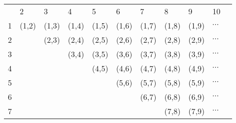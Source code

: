 \begin{table}[!htb]
		\footnotesize
		\centering
		\begin{tabular}{lllllllllll}
			& 2                             & 3                             & 4                            & 5                             & 6                             & 7                             & 8                             & 9                             & 10                                &  \\
			1 & \cellcolor[HTML]{9B9B9B}(1,2) & \cellcolor[HTML]{9B9B9B}(1,3) & \cellcolor[HTML]{C0C0C0}(1,4) & \cellcolor[HTML]{C0C0C0}(1,5) & \cellcolor[HTML]{9B9B9B}(1,6) & \cellcolor[HTML]{9B9B9B}(1,7) & \cellcolor[HTML]{9B9B9B}(1,8) & \cellcolor[HTML]{C0C0C0}(1,9) & \cellcolor[HTML]{C0C0C0}$\cdots$ &  \\
			2 &                               & \cellcolor[HTML]{9B9B9B}(2,3) & \cellcolor[HTML]{C0C0C0}(2,4) & \cellcolor[HTML]{C0C0C0}(2,5) & \cellcolor[HTML]{9B9B9B}(2,6) & \cellcolor[HTML]{9B9B9B}(2,7) & \cellcolor[HTML]{9B9B9B}(2,8) & \cellcolor[HTML]{C0C0C0}(2,9) & \cellcolor[HTML]{C0C0C0}$\cdots$ &  \\
			3 &                               &                               & \cellcolor[HTML]{C0C0C0}(3,4) & \cellcolor[HTML]{C0C0C0}(3,5) & \cellcolor[HTML]{9B9B9B}(3,6) & \cellcolor[HTML]{9B9B9B}(3,7) & \cellcolor[HTML]{9B9B9B}(3,8) & \cellcolor[HTML]{C0C0C0}(3,9) & \cellcolor[HTML]{C0C0C0}$\cdots$ &  \\
			4 &                               &                               &                               & (4,5)                         & \cellcolor[HTML]{C0C0C0}(4,6) & \cellcolor[HTML]{C0C0C0}(4,7) & \cellcolor[HTML]{C0C0C0}(4,8) & (4,9)                         & $\cdots$                         &  \\
			5 &                               &                               &                               &                               & \cellcolor[HTML]{C0C0C0}(5,6) & \cellcolor[HTML]{C0C0C0}(5,7) & \cellcolor[HTML]{C0C0C0}(5,8) & (5,9)                         & $\cdots$                         &  \\
			6 &                               &                               &                               &                               &                               & \cellcolor[HTML]{9B9B9B}(6,7) & \cellcolor[HTML]{9B9B9B}(6,8) & \cellcolor[HTML]{C0C0C0}(6,9) & \cellcolor[HTML]{C0C0C0}$\cdots$ &  \\
			7 &                               &                               &                               &                               &                               &                               & \cellcolor[HTML]{9B9B9B}(7,8) & \cellcolor[HTML]{C0C0C0}(7,9) & \cellcolor[HTML]{C0C0C0}$\cdots$ &  \\

\end{tabular}
\end{table}
